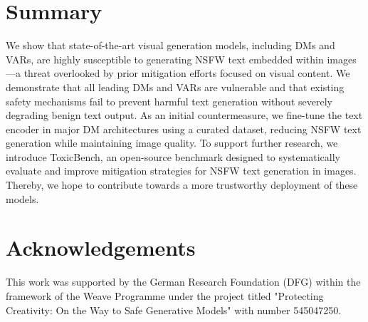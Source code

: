 
\section{Summary}

We show that state-of-the-art visual generation models, including DMs and VARs, are highly susceptible to generating NSFW text embedded within images---a threat overlooked by prior mitigation efforts focused on visual content. We demonstrate that all leading DMs and VARs are vulnerable and that existing safety mechanisms fail to prevent harmful text generation without severely degrading benign text output. As an initial countermeasure, we fine-tune the text encoder in major DM architectures using a curated dataset, reducing NSFW text generation while maintaining image quality. To support further research, we introduce ToxicBench, an open-source benchmark designed to systematically evaluate and improve mitigation strategies for NSFW text generation in images.
Thereby, we hope to contribute towards a more trustworthy deployment of these models.

\section*{Acknowledgements}
This work was supported by the German Research Foundation (DFG) within the framework of the Weave Programme under the project titled "Protecting Creativity: On the Way to Safe Generative Models" with number 545047250. 